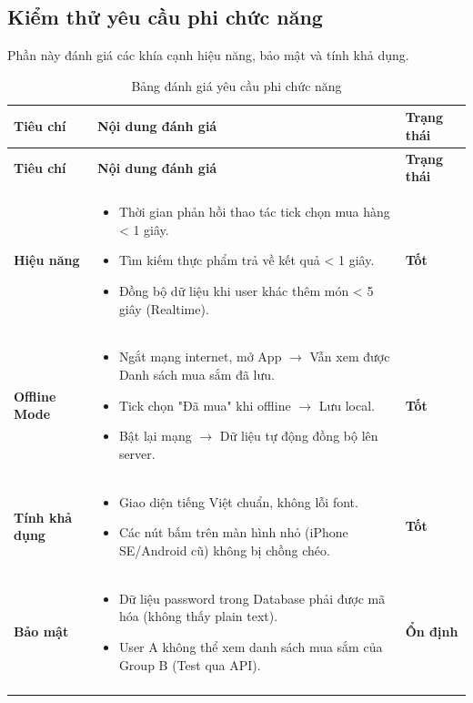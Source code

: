 \subsection{Kiểm thử yêu cầu phi chức năng}

Phần này đánh giá các khía cạnh hiệu năng, bảo mật và tính khả dụng.

\begin{longtable}{|L{3.5cm}|L{9cm}|L{2cm}|}
\hline
\textbf{Tiêu chí} & \textbf{Nội dung đánh giá} & \textbf{Trạng thái} \\
\hline
\endfirsthead
\hline
\textbf{Tiêu chí} & \textbf{Nội dung đánh giá} & \textbf{Trạng thái} \\
\hline
\endhead
\textbf{Hiệu năng} & 
\begin{itemize}[leftmargin=*,nosep]
    \item Thời gian phản hồi thao tác tick chọn mua hàng < 1 giây.
    \item Tìm kiếm thực phẩm trả về kết quả < 1 giây.
    \item Đồng bộ dữ liệu khi user khác thêm món < 5 giây (Realtime).
\end{itemize} & \textbf{Tốt} \\
\hline
\textbf{Offline Mode} & 
\begin{itemize}[leftmargin=*,nosep]
    \item Ngắt mạng internet, mở App $\rightarrow$ Vẫn xem được Danh sách mua sắm đã lưu.
    \item Tick chọn "Đã mua" khi offline $\rightarrow$ Lưu local.
    \item Bật lại mạng $\rightarrow$ Dữ liệu tự động đồng bộ lên server.
\end{itemize} & \textbf{Tốt} \\
\hline
\textbf{Tính khả dụng} & 
\begin{itemize}[leftmargin=*,nosep]
    \item Giao diện tiếng Việt chuẩn, không lỗi font.
    \item Các nút bấm trên màn hình nhỏ (iPhone SE/Android cũ) không bị chồng chéo.
\end{itemize} & \textbf{Tốt} \\
\hline
\textbf{Bảo mật} & 
\begin{itemize}[leftmargin=*,nosep]
    \item Dữ liệu password trong Database phải được mã hóa (không thấy plain text).
    \item User A không thể xem danh sách mua sắm của Group B (Test qua API).
\end{itemize} & \textbf{Ổn định} \\
\hline
\caption{Bảng đánh giá yêu cầu phi chức năng}
\end{longtable}
